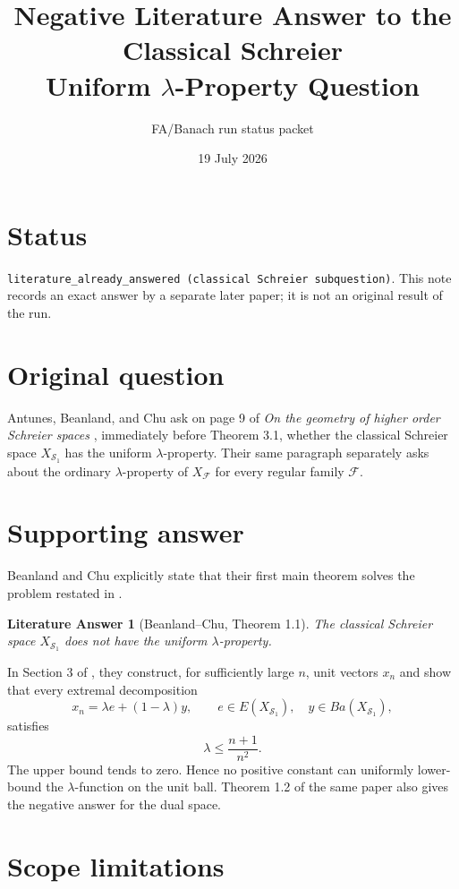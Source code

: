 \documentclass[11pt]{article}
\title{Negative Literature Answer to the Classical Schreier\\
Uniform $\lambda$-Property Question}
\author{FA/Banach run status packet}
\date{19 July 2026}
\newtheorem*{result}{Literature Answer}
\begin{document}
\maketitle

\section*{Status}

\texttt{literature\_already\_answered (classical Schreier subquestion)}.
This note records an exact answer by a separate later paper; it is not an
original result of the run.

\section*{Original question}

Antunes, Beanland, and Chu ask on page 9 of
\emph{On the geometry of higher order Schreier spaces}
\cite{ABC}, immediately before Theorem 3.1, whether the classical Schreier
space $X_{\mathcal S_1}$ has the uniform $\lambda$-property.  Their same
paragraph separately asks about the ordinary $\lambda$-property of
$X_{\mathcal F}$ for every regular family $\mathcal F$.

\section*{Supporting answer}

Beanland and Chu explicitly state that their first main theorem solves the
problem restated in \cite{ABC}.

\begin{result}[Beanland--Chu, Theorem 1.1]
The classical Schreier space $X_{\mathcal S_1}$ does not have the uniform
$\lambda$-property.
\end{result}

In Section 3 of \cite{BC}, they construct, for sufficiently large $n$, unit
vectors $x_n$ and show that every extremal decomposition
\[
  x_n=\lambda e+(1-\lambda)y,
  \qquad e\in E(X_{\mathcal S_1}),\quad y\in Ba(X_{\mathcal S_1}),
\]
satisfies
\[
  \lambda\leq \frac{n+1}{n^2}.
\]
The upper bound tends to zero.  Hence no positive constant can uniformly
lower-bound the $\lambda$-function on the unit ball.  Theorem 1.2 of the same
paper also gives the negative answer for the dual space.

\section*{Scope limitations}
\end{document}
